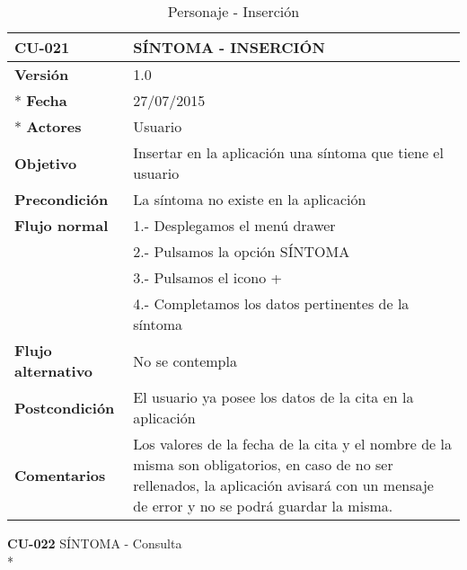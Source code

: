 \documentclass[../pfc.tex]{subfiles}
\begin{document}
	\begin{table}[H]
		\centering
		\begin{tabular}[t]{|p{3cm}|p{9.5cm}|}
			\hline \textbf{CU-021} & \textbf{SÍNTOMA - INSERCIÓN} \\*
			\hline\hline \textbf{Versión} & 1.0 \\ *
			\hline\hline \textbf{Fecha} & 27/07/2015 \\ *
			\hline\textbf{Actores} 	& Usuario\\*
			\hline \textbf{Objetivo} & Insertar en la aplicación una síntoma que tiene el usuario\\* 			
			\hline \textbf{Precondición} & La síntoma no existe en la aplicación\\* 
			\hline \textbf{Flujo normal} & 1.- Desplegamos el menú drawer \\* 
			& 2.- Pulsamos la opción SÍNTOMA\\*	
			& 3.- Pulsamos el icono +\\*	
			& 4.- Completamos los datos pertinentes de la síntoma\\*	
			\hline \textbf{Flujo alternativo} & No se contempla \\* 
			\hline \textbf{Postcondición} & El usuario ya posee los datos de la cita en la aplicación \\* 
			\hline \textbf{Comentarios}   & Los valores de la fecha de la cita y el nombre de la misma son obligatorios, en caso de no ser rellenados, la aplicación avisará con un mensaje de error y no se podrá guardar la misma.\\*
			\hline
		\end{tabular}
		\caption{Personaje - Inserción}
		\label{tabla:caso021}
	\end{table}
	
	\textbf{CU-022}	SÍNTOMA - Consulta\\*
	
\end{document}
